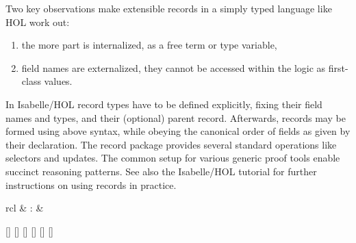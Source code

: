 \begin{isabellebody}
\begin{isamarkuptext}
  \medskip Two key observations make extensible records in a simply
  typed language like HOL work out:

  \begin{enumerate}

  \item the more part is internalized, as a free term or type
  variable,

  \item field names are externalized, they cannot be accessed within
  the logic as first-class values.

  \end{enumerate}

  \medskip In Isabelle/HOL record types have to be defined explicitly,
  fixing their field names and types, and their (optional) parent
  record.  Afterwards, records may be formed using above syntax, while
  obeying the canonical order of fields as given by their declaration.
  The record package provides several standard operations like
  selectors and updates.  The common setup for various generic proof
  tools enable succinct reasoning patterns.  See also the Isabelle/HOL
  tutorial \cite{isabelle-hol-book} for further instructions on using
  records in practice.%
\end{isamarkuptext}%
\isamarkuptrue%
%
\isamarkuptrue%
%
\begin{isamarkuptext}%
\begin{matharray}{rcl}
    \hypertarget{command.HOL.record}{\hyperlink{command.HOL.record}{\mbox{}}} & : &  \\
  \end{matharray}

  \begin{railoutput}
[]
[]
[]
\rail@bar
{}
[]
[]
\rail@endbar
\rail@plus
{}[]
\rail@endplus
\rail@end
\end{railoutput}



\end{isamarkuptext}
\end{isabellebody}
